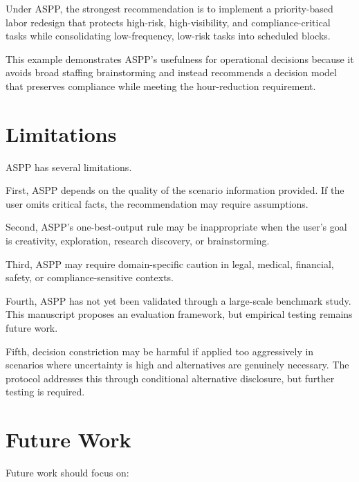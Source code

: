 \documentclass[11pt]{article}
\begin{document}
Under ASPP, the strongest recommendation is to implement a priority-based labor redesign that protects high-risk, high-visibility, and compliance-critical tasks while consolidating low-frequency, low-risk tasks into scheduled blocks.

This example demonstrates ASPP's usefulness for operational decisions because it avoids broad staffing brainstorming and instead recommends a decision model that preserves compliance while meeting the hour-reduction requirement.

\section{Limitations}

ASPP has several limitations.

First, ASPP depends on the quality of the scenario information provided. If the user omits critical facts, the recommendation may require assumptions.

Second, ASPP's one-best-output rule may be inappropriate when the user's goal is creativity, exploration, research discovery, or brainstorming.

Third, ASPP may require domain-specific caution in legal, medical, financial, safety, or compliance-sensitive contexts.

Fourth, ASPP has not yet been validated through a large-scale benchmark study. This manuscript proposes an evaluation framework, but empirical testing remains future work.

Fifth, decision constriction may be harmful if applied too aggressively in scenarios where uncertainty is high and alternatives are genuinely necessary. The protocol addresses this through conditional alternative disclosure, but further testing is required.

\section{Future Work}

Future work should focus on:
\end{document}
